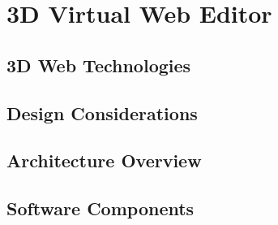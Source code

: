 \section{3D Virtual Web Editor}


\subsection{3D Web Technologies}

\subsection{Design Considerations}

\subsection{Architecture Overview}

\subsection{Software Components}

